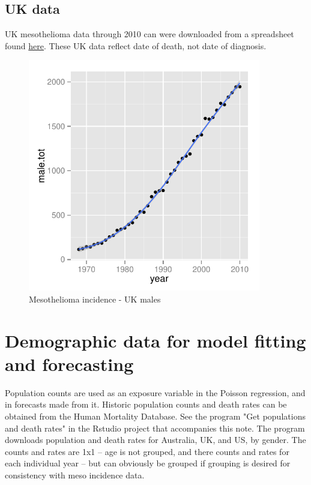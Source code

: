 \documentclass{article}\usepackage{graphicx, color}
\newenvironment{knitrout}{}{} %
\begin{document}
\FloatBarrier

\subsection{UK data}

UK mesothelioma data through 2010 can were downloaded from a spreadsheet found \href{http://www.hse.gov.uk/statistics/tables/index.htm#lung}{here}.  These UK data reflect date of death, not date of diagnosis.  

\begin{figure}[ht]
\vspace{.3in}
\centering
\begin{knitrout}
\color{fgcolor}
\includegraphics[width=4in,height=4in]{figure/Chunk-uk-males} 

\end{knitrout}

\caption{ Mesothelioma incidence - UK males}

\vspace{.3in}
\end{figure}

\FloatBarrier



\section{Demographic data for model fitting and forecasting}


Population counts are used as an exposure variable in the Poisson regression, and in forecasts made from it.  Historic population counts and death rates can be obtained from the Human Mortality Database.  See the program "Get populations and death rates" in the Rstudio project that accompanies this note.  The program downloads population and death rates for Australia, UK, and US, by gender.  The counts and rates are 1x1 -- age is not grouped, and there counts and rates for each individual year -- but can obviously be grouped if grouping is desired for consistency with meso incidence data.
\end{document}
